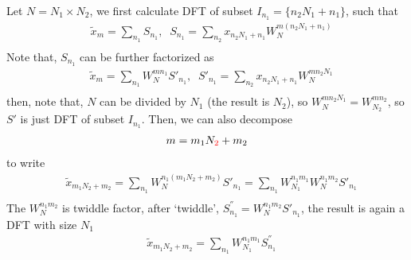 Let $N=N_1\times N_2$, we first calculate DFT of subset $I_{n_1}=\{n_2N_1+n_1\}$, such that
\begin{equation}
\begin{split}
&\tilde{x}_m=\sum _{n_1} S_{n_1},\;\;S_{n_1}=\sum _{n_2}x_{n_2N_1+n_1}W_N^{m(n_2N_1+n_1)}\\
\end{split}
\end{equation}
Note that, $S_{n_1}$ can be further factorized as
\begin{equation}
\begin{split}
&\tilde{x}_m=\sum _{n_1} W_N^{mn_1}S'_{n_1},\;\;S'_{n_1}=\sum _{n_2}x_{n_2N_1+n_1}W_N^{mn_2N_1}\\
\end{split}
\end{equation}
then, note that, $N$ can be divided by $N_1$ (the result is $N_2$), so $W_N^{mn_2N_1}=W_{N_2}^{mn_2}$, so $S'$ is just DFT of subset $I_{n_1}$. Then, we can also decompose
\begin{equation}
\begin{split}
&m=m_1N_{\textcolor[rgb]{1,0,0}{2}}+m_2\\
\end{split}
\end{equation}
to write
\begin{equation}
\begin{split}
&\tilde{x}_{m_1N_2+m_2}=\sum _{n_1} W_N^{n_1(m_1N_2+m_2)}S'_{n_1}=\sum _{n_1} W_{N_1}^{n_1m_1}W_N^{n_1m_2}S'_{n_1}\\
\end{split}
\end{equation}
The $W_N^{n_1m_2}$ is twiddle factor, after `twiddle', $S^{''}_{n_1}=W_N^{n_1m_2}S'_{n_1}$, the result is again a DFT with size $N_1$
\begin{equation}
\begin{split}
&\tilde{x}_{m_1N_2+m_2}=\sum _{n_1} W_{N_1}^{n_1m_1}S^{''}_{n_1}\\
\end{split}
\end{equation}

